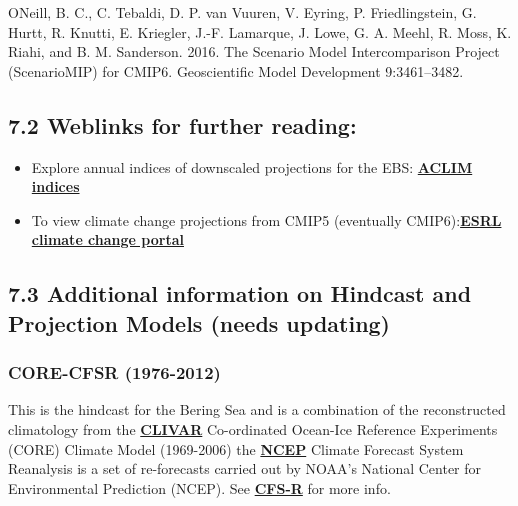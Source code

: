 \documentclass[
]{article}
\begin{document}
ONeill, B. C., C. Tebaldi, D. P. van Vuuren, V. Eyring, P.
Friedlingstein, G. Hurtt, R. Knutti, E. Kriegler, J.-F. Lamarque, J.
Lowe, G. A. Meehl, R. Moss, K. Riahi, and B. M. Sanderson. 2016. The
Scenario Model Intercomparison Project (ScenarioMIP) for CMIP6.
Geoscientific Model Development 9:3461--3482.

\hypertarget{weblinks-for-further-reading}{%
\subsection{7.2 Weblinks for further
reading:}\label{weblinks-for-further-reading}}

\begin{itemize}
\item
  Explore annual indices of downscaled projections for the EBS:
  \href{https://kholsman.shinyapps.io/aclim/}{\textbf{ACLIM indices}}
\item
  To view climate change projections from CMIP5 (eventually
  CMIP6):\href{https://www.esrl.noaa.gov/psd/ipcc/ocn/}{\textbf{ESRL
  climate change portal }}
\end{itemize}

\hypertarget{additional-information-on-hindcast-and-projection-models-needs-updating}{%
\subsection{7.3 Additional information on Hindcast and Projection Models
(needs
updating)}\label{additional-information-on-hindcast-and-projection-models-needs-updating}}

\hypertarget{core-cfsr-1976-2012}{%
\subsubsection{CORE-CFSR (1976-2012)}\label{core-cfsr-1976-2012}}

This is the hindcast for the Bering Sea and is a combination of the
reconstructed climatology from the
\href{http://portal.aoos.org/bering-sea.php\#module-metadata/5626a0b6-7d79-11e3-ac17-00219bfe5678/0756e6c2-a8e2-40af-aa3d-22051ed68067}{\textbf{CLIVAR}}
Co-ordinated Ocean-Ice Reference Experiments (CORE) Climate Model
(1969-2006) the
\href{http://portal.aoos.org/bering-sea.php\#module-metadata/f8cb79f6-7d59-11e3-a6ee-00219bfe5678/2deb2eca-f3f5-4eda-a132-112468711de7}{\textbf{NCEP}}
Climate Forecast System Reanalysis is a set of re-forecasts carried out
by NOAA's National Center for Environmental Prediction (NCEP). See
\href{http://cfs.ncep.noaa.gov/cfsr/}{\textbf{CFS-R}} for more info.
\end{document}
